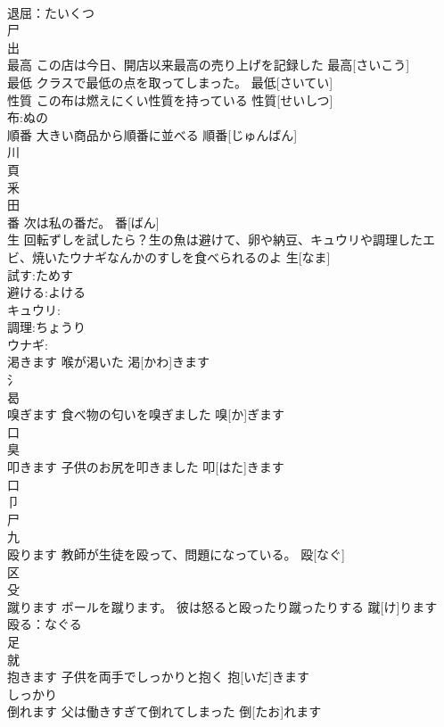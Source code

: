 \documentclass[8pt]{extreport}
\begin{document}
\begin{CJK}{UTF8}{min}
\\	退屈：たいくつ
\\	尸 
\\	出 
\\	最高	この店は今日、開店以来最高の売り上げを記録した	最高[さいこう]			
\\	最低	クラスで最低の点を取ってしまった。	最低[さいてい]			
\\	性質	この布は燃えにくい性質を持っている	性質[せいしつ]			
\\	布:ぬの
\\	順番	大きい商品から順番に並べる	順番[じゅんばん]			
\\	川 
\\	頁 
\\	釆 
\\	田 
\\	番	次は私の番だ。	番[ばん]			
\\	生	回転ずしを試したら？生の魚は避けて、卵や納豆、キュウリや調理したエビ、焼いたウナギなんかのすしを食べられるのよ	生[なま]	
\\	試す:ためす
\\	避ける:よける
\\	キュウリ:
\\	調理:ちょうり
\\	ウナギ:
\\	渇きます	喉が渇いた	渇[かわ]きます			
\\	氵 
\\	曷 
\\	嗅ぎます	食べ物の匂いを嗅ぎました	嗅[か]ぎます			
\\	口 
\\	臭 
\\	叩きます	子供のお尻を叩きました	叩[はた]きます			
\\	口 
\\	卩 
\\	尸 
\\	九 
\\	殴ります	教師が生徒を殴って、問題になっている。	殴[なぐ]			
\\	区 
\\	殳 
\\	蹴ります	ボールを蹴ります。 彼は怒ると殴ったり蹴ったりする	蹴[け]ります			
\\	殴る：なぐる
\\	足 
\\	就 
\\	抱きます	子供を両手でしっかりと抱く	抱[いだ]きます			
\\	しっかり　
\\	倒れます	父は働きすぎて倒れてしまった	倒[たお]れます			

\end{CJK}
\end{document}
